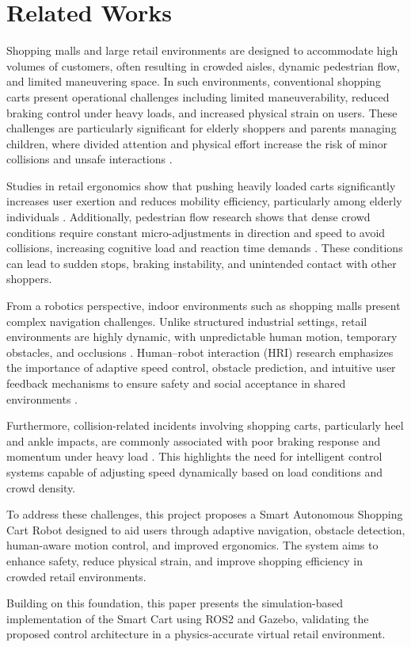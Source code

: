 \section{Related Works}

Shopping malls and large retail environments are designed to accommodate
high volumes of customers, often resulting in crowded aisles, dynamic
pedestrian flow, and limited maneuvering space. In such environments,
conventional shopping carts present operational challenges including
limited maneuverability, reduced braking control under heavy loads, and
increased physical strain on users. These challenges are particularly
significant for elderly shoppers and parents managing children, where
divided attention and physical effort increase the risk of minor
collisions and unsafe interactions \cite{goodrich2007, ting2003}.

Studies in retail ergonomics show that pushing heavily loaded carts
significantly increases user exertion and reduces mobility efficiency,
particularly among elderly individuals \cite{wirawan2024}. Additionally,
pedestrian flow research shows that dense crowd conditions require
constant micro-adjustments in direction and speed to avoid collisions,
increasing cognitive load and reaction time demands \cite{molnar1995, ishii2015}.
These conditions can lead to sudden stops, braking instability, and
unintended contact with other shoppers.

From a robotics perspective, indoor environments such as shopping malls
present complex navigation challenges. Unlike structured industrial
settings, retail environments are highly dynamic, with unpredictable
human motion, temporary obstacles, and occlusions \cite{thrun2005}.
Human--robot interaction (HRI) research emphasizes the importance of
adaptive speed control, obstacle prediction, and intuitive user feedback
mechanisms to ensure safety and social acceptance in shared environments
\cite{goodrich2007}.

Furthermore, collision-related incidents involving shopping carts,
particularly heel and ankle impacts, are commonly associated with poor
braking response and momentum under heavy load \cite{smith2006,
vinck2019}. This highlights the need for intelligent control systems
capable of adjusting speed dynamically based on load conditions and
crowd density.

To address these challenges, this project proposes a Smart Autonomous
Shopping Cart Robot designed to aid users through adaptive navigation,
obstacle detection, human-aware motion control, and improved ergonomics.
The system aims to enhance safety, reduce physical strain, and improve
shopping efficiency in crowded retail environments.

Building on this foundation, this paper presents the simulation-based
implementation of the Smart Cart using ROS2 and Gazebo, validating
the proposed control architecture in a physics-accurate virtual
retail environment.